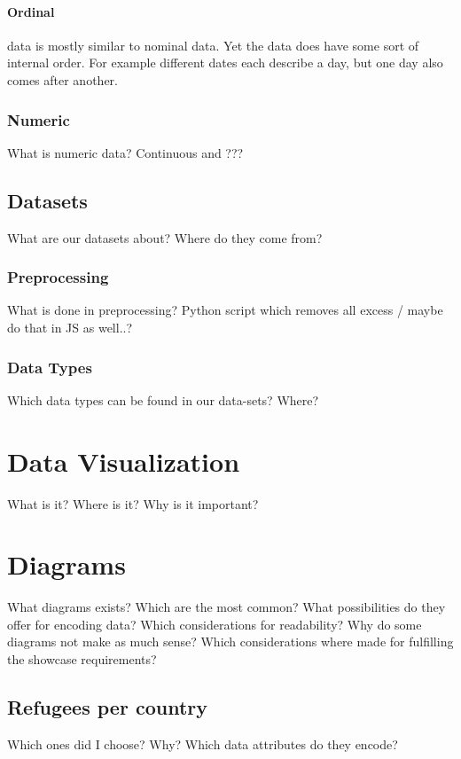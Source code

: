 \paragraph{Ordinal}
data is mostly similar to nominal data. Yet the data does have some sort of internal order. For example different dates each describe a day, but one day also comes after another.

\subsubsection{Numeric}
What is numeric data? Continuous and ???

\subsection{Datasets}
What are our datasets about? Where do they come from?

\subsubsection{Preprocessing}
What is done in preprocessing? Python script which removes all excess / maybe do that in JS as well..?

\subsubsection{Data Types}
Which data types can be found in our data-sets? Where?


\section{Data Visualization}
What is it? Where is it? Why is it important?


\section{Diagrams}
What diagrams exists? Which are the most common? What possibilities do they offer for encoding data? Which considerations for readability? Why do some diagrams not make as much sense? Which considerations where made for fulfilling the showcase requirements?

\subsection{Refugees per country}
Which ones did I choose? Why? Which data attributes do they encode?

